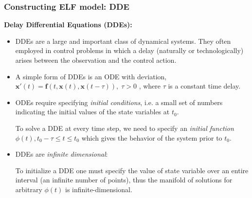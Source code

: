 \documentclass[10pt,xcolor=dvipsnames,compress]{beamer}
\begin{document}
\begin{frame}
\frametitle{Constructing ELF model: DDE}
\vfill


\textbf{Delay Differential Equations (DDEs):}


\begin{itemize}
\item DDEs are a large and important class of dynamical systems. They
often employed in control problems in which a delay (naturally or technologically) arises between the observation and
the control action.


\item A simple form of DDEs is an ODE with deviation,
$
\mathbf{x}'(t) = \mathbf{f}(t,\mathbf{x}(t), \mathbf{x}(t-\tau)), \; \tau>0
$
, where $\tau$ is a constant time delay.


\item ODEs require specifying \textit{initial conditions}, i.e. a small set of numbers indicating the initial values of the state variables at $t_0$.

To solve a DDE at every time step, we need to specify an \textit{initial function} $\phi(t), t_0-\tau \leq t \leq t_0$ which gives the behavior of the system prior to $t_0$.


\item DDEs are \textit{infinite dimensional}:

To initialize a DDE one must specify the value of state variable over an entire interval (an infinite number of points), thus the manifold of solutions for arbitrary $\phi(t)$ is infinite-dimensional.


\end{itemize}



\vfill
\end{frame}
\end{document}
